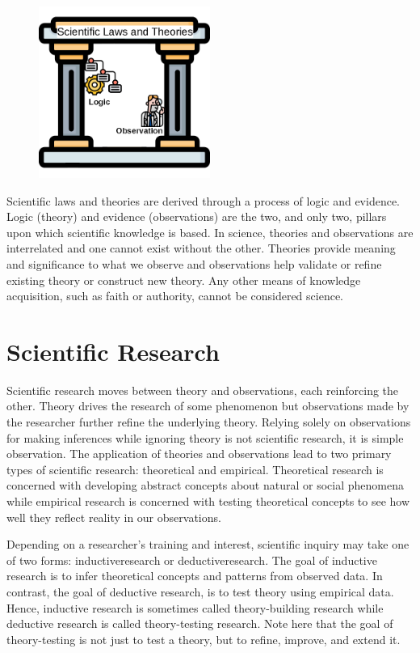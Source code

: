 \begin{figure}
	\caption*{} %
	\label{01:fig04} 
	\centering
	\includegraphics[width=0.5\textwidth]{gfx/01-pillars} 
\end{figure}
Scientific laws and theories are derived through a process of logic and evidence. Logic (theory) and evidence (observations) are the two, and only two, pillars upon which scientific knowledge is based. In science, theories and observations are interrelated and one cannot exist without the other. Theories provide meaning and significance to what we observe and observations help validate or refine existing theory or construct new theory. Any other means of knowledge acquisition, such as faith or authority, cannot be considered science.

\section{Scientific Research}

Scientific research moves between theory and observations, each reinforcing the other. Theory drives the research of some phenomenon but observations made by the researcher further refine the underlying theory. Relying solely on observations for making inferences while ignoring theory is not scientific research, it is simple observation. The application of theories and observations lead to two primary types of scientific research: theoretical and empirical. Theoretical research is concerned with developing abstract concepts about natural or social phenomena while empirical research is concerned with testing theoretical concepts to see how well they reflect reality in our observations. 

Depending on a researcher's training and interest, scientific inquiry may take one of two forms: \gls{inductiveresearch} or \gls{deductiveresearch}. The goal of inductive research is to infer theoretical concepts and patterns from observed data. In contrast, the goal of deductive research, is to test theory using empirical data. Hence, inductive research is sometimes called theory-building research while deductive research is called theory-testing research. Note here that the goal of theory-testing is not just to test a theory, but to refine, improve, and extend it. 

